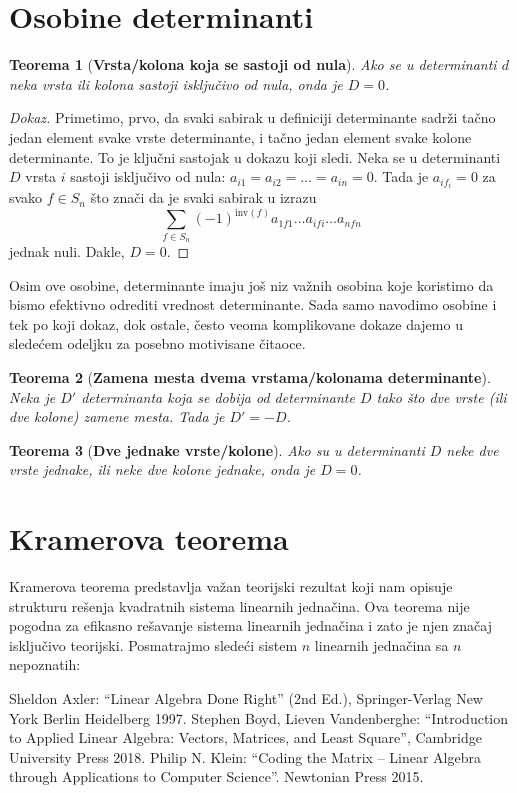 \documentclass[11pt]{article}
\newtheorem{theorem}{Teorema}
\begin{document}
\pagebreak
\section{Osobine determinanti}
\begin{theorem}[{\textbf{Vrsta/kolona koja se sastoji od nula}}]
Ako se u determinanti $d$ neka vrsta ili kolona sastoji isključivo od nula, onda je $D = 0$.
\end{theorem}
\begin{proof}[{\normalfont Dokaz}]
    Primetimo, prvo, da svaki sabirak u definiciji determinante sadrži tačno jedan element svake
    vrste determinante, i tačno jedan element svake kolone determinante.
    To je ključni sastojak u dokazu koji sledi.
    Neka se u determinanti $D$ vrsta $i$ sastoji isključivo od nula:
    $a_{i1} = a_{i2} = \ldots = a_{in} = 0$.
    Tada je $a_{if_i} = 0$ za svako $f \in S_n$ što znači da je svaki sabirak u izrazu
    \[
        \sum_{f \in S_n} (-1)^{\mathrm{inv}(f)} a_{1f1} \ldots a_{ifi} \ldots a_{nfn}
    \]
    jednak nuli. Dakle, $D = 0$.  
\end{proof}

Osim ove osobine, determinante imaju još niz važnih osobina koje koristimo da bismo
efektivno odrediti vrednost determinante. Sada samo navodimo osobine i tek po koji dokaz, dok ostale, često veoma komplikovane
dokaze dajemo u sledećem odeljku za posebno motivisane čitaoce.

\begin{theorem}[{\textbf{Zamena mesta dvema vrstama/kolonama determinante}}]
    Neka je $D'$ determinanta koja se dobija od determinante $D$ tako što dve vrste (ili dve kolone)
    zamene mesta. Tada je $D' = -D$.
\end{theorem}

\begin{theorem}[{\textbf{Dve jednake vrste/kolone}}]
  Ako su u determinanti $D$ neke dve vrste jednake, ili neke dve kolone jednake, onda je $D = 0$.
\end{theorem}

\section{Kramerova teorema}

Kramerova teorema predstavlja važan teorijski rezultat koji nam opisuje strukturu rešenja
kvadratnih sistema linearnih jednačina. Ova teorema nije pogodna za efikasno rešavanje sistema
linearnih jednačina i zato je njen značaj isključivo teorijski.
Posmatrajmo sledeći sistem $n$ linearnih jednačina sa $n$ nepoznatih:


\begin{thebibliography}{xx}
     Sheldon Axler: ``Linear Algebra Done Right'' (2nd Ed.), Springer-Verlag New York Berlin Heidelberg 1997.
     Stephen Boyd, Lieven Vandenberghe: ``Introduction to Applied Linear Algebra: Vectors, Matrices, and Least Square'',
Cambridge University Press 2018.
     Philip N. Klein: ``Coding the Matrix -- Linear Algebra through Applications to Computer Science''.
Newtonian Press 2015.
\end{thebibliography}    
\end{document}
